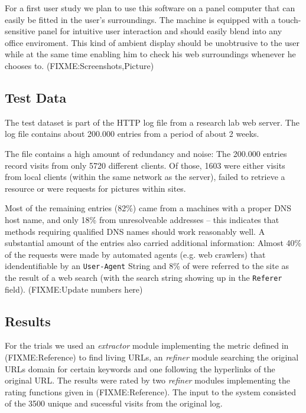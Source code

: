 \documentclass[a4paper]{danarticle}
\begin{document}
      For a first user study we plan to use this software on a panel computer 
      that can easily be fitted in the user's surroundings. The machine is 
      equipped with a touch-sensitive panel for intuitive user interaction and 
      should easily blend into any office enviroment. This kind of ambient 
      display should be unobtrusive to the user while at the same time enabling 
      him to check his web surroundings whenever he chooses to.
      (FIXME:Screenshots,Picture)
    \subsection{Test Data}
      The test dataset is part of the HTTP log file from a research lab
      web server. The log file contains about 200.000 entries from a period of
      about 2 weeks.
      
      The file contains a high amount of redundancy and noise: The 200.000 
      entries record visits from only 5720 different clients. Of those, 1603 
      were either visits from local clients (within the same network as the 
      server), failed to retrieve a resource or were requests for pictures 
      within sites.
      
      Most of the remaining entries (82\%) came from a machines with a proper
      DNS host name, and only 18\% from unresolveable addresses -- this indicates
      that methods requiring qualified DNS names should work reasonably well. A
      substantial amount of the entries also carried additional information:
      Almost 40\% of the requests were made by automated agents (e.g. web
      crawlers) that idendentifiable by an \verb$User-Agent$ String and 8\% of
      were referred to the site as the result of a web search (with the search
      string showing up in the \verb$Referer$ field). (FIXME:Update numbers 
      here)
    \subsection{Results}
      For the trials we used an \textit{extractor} module implementing the
      metric defined in (FIXME:Reference) to find living URLs, an
      \textit{refiner} module searching the original URLs domain for certain
      keywords and one following the hyperlinks of the original URL. The results
      were rated by two \textit{refiner} modules implementing the rating
      functions given in (FIXME:Reference). The input to the system consisted of
      the 3500 unique and sucessful visits from the original log.
      
\end{document}

